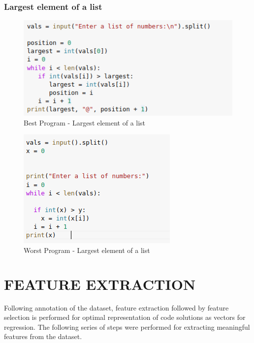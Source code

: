 \newpage

\subsubsection{Largest element of a list}

\begin{figure}[h]
\centering
\includegraphics[]{./figures/best_la.png}
\caption{Best Program - Largest element of a list}
\label{fig1}
\end{figure}

\begin{figure}[h]
\centering
\includegraphics[]{./figures/worst_la.png}
\caption{Worst Program - Largest element of a list}
\label{fig1}
\end{figure}

\newpage

\section{FEATURE EXTRACTION}

Following annotation of the dataset, feature extraction followed by feature selection is performed for optimal representation of code solutions as vectors for regression. The following series of steps were performed for extracting meaningful features from the dataset.


